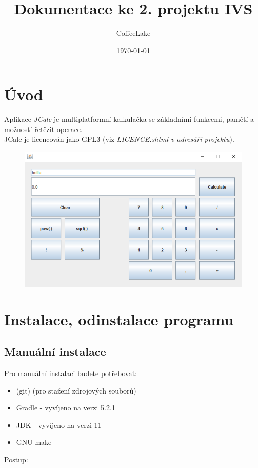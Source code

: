 \documentclass[a4paper, 11pt]{article}
\title{Dokumentace ke 2. projektu IVS}
\author{CoffeeLake}
\date{\today}
\begin{document}
	
\maketitle
\tableofcontents


\newpage

\section{Úvod}

Aplikace \emph{JCalc} je multiplatformní kalkulačka se základními funkcemi, pamětí a možností řetězit operace.\\
JCalc je licencován jako GPL3 (viz \emph{LICENCE.shtml v adresáři projektu}).

\begin{figure}[ht]
	\centering
	\includegraphics[width=.7\textwidth]{../screenshot.png}
\end{figure}

\section{Instalace, odinstalace programu}

\subsection{Manuální instalace}

Pro manuální instalaci budete potřebovat:

\begin{itemize}
	\item (git) (pro stažení zdrojových souborů)
	\item Gradle - vyvíjeno na verzi 5.2.1
	\item JDK - vyvíjeno na verzi 11
	\item GNU make
\end{itemize}

Postup:
\end{document}
